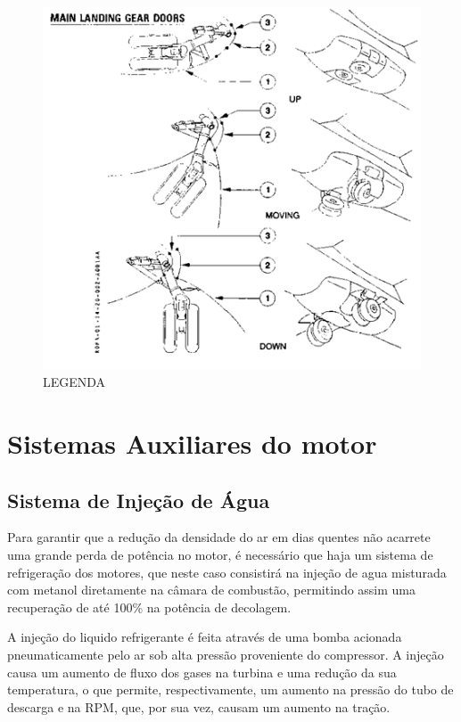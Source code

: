 \begin{figure}
\includegraphics[width=\textwidth]{images/parte3/sistemas_trem_de_pouso.png}
\caption{LEGENDA}
\label{fig:sistemas_trem_de_pouso}
\end{figure}


\section{Sistemas Auxiliares do motor}

\subsection{Sistema de Injeção de Água}

Para garantir que a redução da densidade do ar em dias quentes não acarrete uma grande perda de potência no motor, é necessário que haja um sistema de refrigeração dos motores, que neste caso consistirá na injeção de agua misturada com metanol diretamente na câmara de combustão, permitindo assim uma recuperação de até 100\% na potência de decolagem.

A injeção do liquido refrigerante é feita através de uma bomba acionada pneumaticamente pelo ar sob alta pressão proveniente do compressor.
A injeção causa um aumento de fluxo dos gases na turbina e uma redução da sua temperatura, o que permite, respectivamente, um aumento na pressão do tubo de descarga e na RPM, que, por sua vez, causam um aumento na tração.

